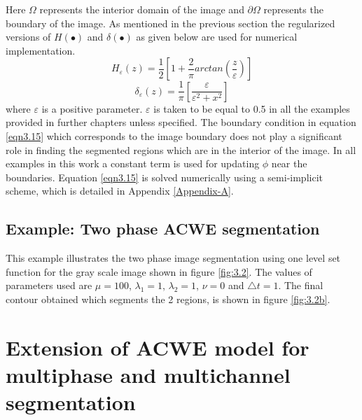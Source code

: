\documentclass[10pt,letterpaper, onecolumn]{article}
\begin{document}
%
%
Here $\Omega$ represents the interior domain of the image and $\partial \Omega$ represents the boundary of the image. As mentioned in the previous section the regularized versions of $H(\bullet)$ and $\delta(\bullet)$ as given below are used 
for numerical implementation. 
\begin{equation}
H_{\varepsilon}(z) = \frac{1}{2} \left[ 1 + \frac{2}{\pi} arctan \left( \frac{z}{\varepsilon} \right) \right]
\label{eqn3.16}
\end{equation}
%
%
\begin{equation}
\delta_{\varepsilon}(z) = \frac{1}{\pi} \left[ \frac{\varepsilon}{\varepsilon^2 + x^2} \right]
\label{eqn3.17}
\end{equation}
%
%
where $\varepsilon$ is a positive parameter. $\varepsilon$ is taken to be equal to 0.5 in all the examples provided in further chapters unless specified. The boundary condition in equation \eqref{eqn3.15} which corresponds to the image boundary does not play a significant role in finding the segmented regions which are in the interior of the image. In all examples in this work a constant term is used for updating $\phi$ near the boundaries. Equation \eqref{eqn3.15} is solved numerically using a semi-implicit scheme, which is detailed in Appendix \ref{Appendix-A}.

\subsection{Example: Two phase ACWE segmentation}

This example illustrates the two phase image segmentation using one level set function for the gray scale image shown in figure \ref{fig:3.2}. 
The values of parameters used are $\mu = 100$, $\lambda_1 = 1$, $\lambda_2 = 1$, $\nu = 0$ and $\triangle t = 1$.
The final contour obtained which segments the 2 regions, is shown in figure \ref{fig:3.2b}.


\section{Extension of ACWE model for multiphase and multichannel segmentation}
\end{document}

